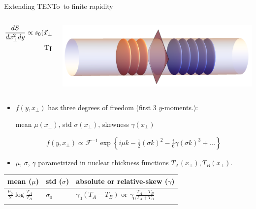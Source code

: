 \documentclass[11pt]{beamer}
\newcommand{\TRENTo}{T\raisebox{-0.2em}{R}ENTo~}
\begin{document}
\begin{frame}{Extending \TRENTo to finite rapidity}
\begin{columns}
\begin{column}{0.7\textwidth}
\begin{eqnarray}
\nonumber 
\frac{dS}{dx_\perp^2d y} \propto
s_0(\vec{x}_\perp, y=0)  &\times&	{\color{orange}f(y, x_\perp)}.\\
\nonumber 
\textrm{ \TRENTo} &\times& \textrm{{\color{orange} rapidity profile}}
\end{eqnarray} 
\end{column}
\begin{column}{0.3\textwidth}
\includegraphics[width=\textwidth]{traincar-crop.pdf}
\end{column}
\end{columns}

\begin{itemize}
\item {\color{orange} $f(y, x_\perp)$} has three degrees of freedom (first 3 $y$-moments.):\\
\begin{center}
mean $\mu(x_\perp)$, std $\sigma(x_\perp)$, skewness $\gamma(x_\perp)$
\end{center}
\vspace*{-0.2cm}
\begin{eqnarray}\nonumber 
f(y, x_\perp) \propto \mathcal{F}^{-1}\exp\left\{i\mu k -\frac{1}{2}(\sigma k)^2 - \frac{i}{6}\gamma(\sigma k)^3 + ...\right\}
\end{eqnarray}
\item $\mu$, $\sigma$, $\gamma$ parametrized in nuclear thickness functions $T_A(x_\perp), T_B(x_\perp)$.
\end{itemize}
\begin{center}
\begin{tabularx}{0.8\textwidth}{p{2.3cm}p{1.2cm}p{6cm}}
\hline
mean ($\mu$) & std ($\sigma$) &$\left.\right.${\color{red!70}absolute} or {\color{blue!70}relative}-skew ($\gamma$) \\
\hline
\noalign{\smallskip}
$\frac{\mu_0}{2} \log\frac{T_A}{T_B}$ & $\sigma_0$ & $\left.\right.${\color{red!70}$\gamma_0(T_A-T_B)$} 
or 
{\color{blue!70}$\gamma_0\frac{T_A-T_B}{T_A+T_B}$} \\
\noalign{\smallskip}
\hline
\end{tabularx}
\end{center}
\end{frame}
\end{document}
